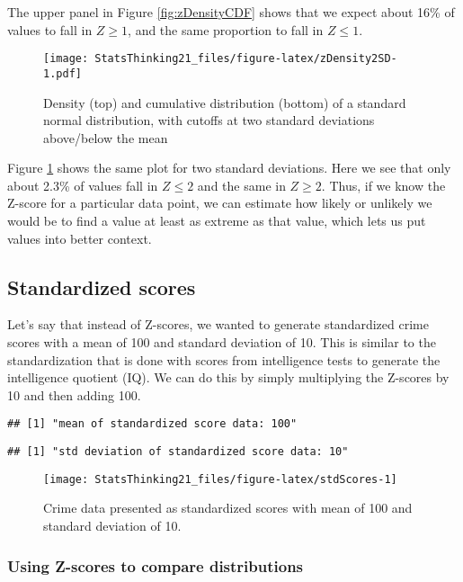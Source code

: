 \documentclass[]{book}
\theoremstyle{definition}
\theoremstyle{definition}
\theoremstyle{definition}
\theoremstyle{remark}
\begin{document}
The upper panel in Figure \ref{fig:zDensityCDF} shows that we expect
about 16\% of values to fall in \(Z\ge 1\), and the same proportion to
fall in \(Z\le 1\).

\begin{figure}
\centering
\texttt{[image: StatsThinking21\_files/figure-latex/zDensity2SD-1.pdf]}
\caption{\label{fig:zDensity2SD}Density (top) and cumulative distribution
(bottom) of a standard normal distribution, with cutoffs at two standard
deviations above/below the mean}
\end{figure}

Figure \ref{fig:zDensity2SD} shows the same plot for two standard
deviations. Here we see that only about 2.3\% of values fall in
\(Z \le 2\) and the same in \(Z \ge 2\). Thus, if we know the Z-score
for a particular data point, we can estimate how likely or unlikely we
would be to find a value at least as extreme as that value, which lets
us put values into better context.

\subsection{Standardized scores}\label{standardized-scores}

Let's say that instead of Z-scores, we wanted to generate standardized
crime scores with a mean of 100 and standard deviation of 10. This is
similar to the standardization that is done with scores from
intelligence tests to generate the intelligence quotient (IQ). We can do
this by simply multiplying the Z-scores by 10 and then adding 100.

\begin{verbatim}
## [1] "mean of standardized score data: 100"
\end{verbatim}

\begin{verbatim}
## [1] "std deviation of standardized score data: 10"
\end{verbatim}

\begin{figure}
\texttt{[image: StatsThinking21\_files/figure-latex/stdScores-1]} \caption{Crime data presented as standardized scores with mean of  100 and standard deviation of 10.}\label{fig:stdScores}
\end{figure}

\subsubsection{Using Z-scores to compare
distributions}\label{using-z-scores-to-compare-distributions}
\end{document}
